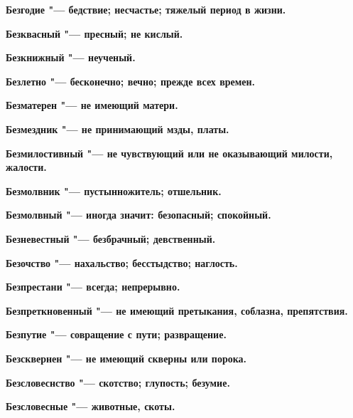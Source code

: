 \begin{mymulticols}{2}
\bfseries Безгодие\normalfont{} "--- бедствие; несчастье; тяжелый период в жизни. 




\bfseries Безквасный\normalfont{} "--- пресный; не кислый. 




\bfseries Безкнижный\normalfont{} "--- неученый. 




\bfseries Безлетно\normalfont{} "--- бесконечно; вечно; прежде всех времен. 




\bfseries Безматерен\normalfont{} "--- не имеющий матери. 




\bfseries Безмездник\normalfont{} "--- не принимающий мзды, платы. 




\bfseries Безмилостивный\normalfont{} "--- не чувствующий или не оказывающий милости, жалости. 




\bfseries Безмолвник\normalfont{} "--- пустынножитель; отшельник. 




\bfseries Безмолвный\normalfont{} "--- иногда значит: безопасный; спокойный. 




\bfseries Безневестный\normalfont{} "--- безбрачный; девственный. 




\bfseries Безочство\normalfont{} "--- нахальство; бесстыдство; наглость. 




\bfseries Безпрестани\normalfont{} "--- всегда; непрерывно. 




\bfseries Безпреткновенный\normalfont{} "--- не имеющий претыкания, соблазна, препятствия. 




\bfseries Безпутие\normalfont{} "--- совращение с пути; развращение. 




\bfseries Безсквернен\normalfont{} "--- не имеющий скверны или порока. 




\bfseries Безсловеснство\normalfont{} "--- скотство; глупость; безумие. 




\bfseries Безсловесные\normalfont{} "--- животные, скоты. 





\end{mymulticols}
